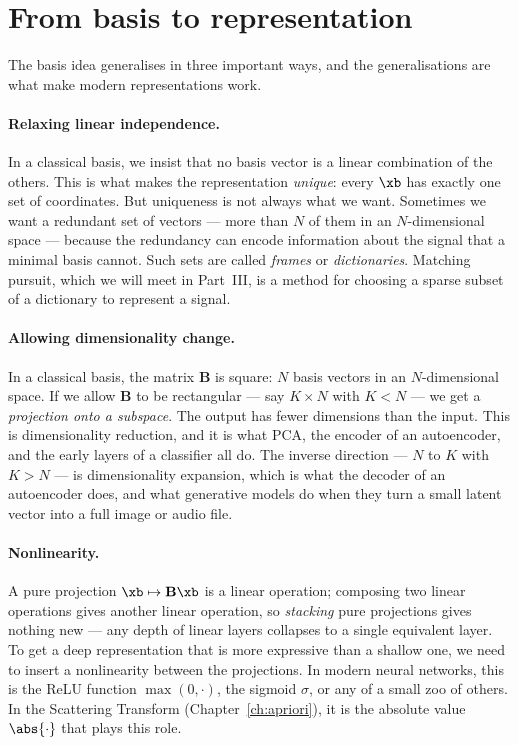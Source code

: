 \section{From basis to representation}
\label{sec:representations}

The basis idea generalises in three important ways, and the
generalisations are what make modern representations work.

\paragraph{Relaxing linear independence.}
In a classical basis, we insist that no basis vector is a linear
combination of the others.  This is what makes the representation
\emph{unique}: every $\xb$ has exactly one set of coordinates.  But
uniqueness is not always what we want.  Sometimes we want a redundant
set of vectors --- more than $N$ of them in an $N$-dimensional space ---
because the redundancy can encode information about the signal that a
minimal basis cannot.  Such sets are called \emph{frames} or
\emph{dictionaries}.  Matching pursuit, which we will meet in
Part~\textsc{III}, is a method for choosing a sparse subset of a
dictionary to represent a signal.

\paragraph{Allowing dimensionality change.}
In a classical basis, the matrix $\mathbf{B}$ is square: $N$ basis
vectors in an $N$-dimensional space.  If we allow $\mathbf{B}$ to be
rectangular --- say $K \times N$ with $K < N$ --- we get a
\emph{projection onto a subspace}.  The output has fewer dimensions than
the input.  This is dimensionality reduction, and it is what PCA, the
encoder of an autoencoder, and the early layers of a classifier all do.
The inverse direction --- $N$ to $K$ with $K > N$ --- is dimensionality
expansion, which is what the decoder of an autoencoder does, and what
generative models do when they turn a small latent vector into a full
image or audio file.

\paragraph{Nonlinearity.}
A pure projection $\xb \mapsto \mathbf{B}\xb$ is a linear operation;
composing two linear operations gives another linear operation, so
\emph{stacking} pure projections gives nothing new --- any depth of
linear layers collapses to a single equivalent layer.  To get a deep
representation that is more expressive than a shallow one, we need to
insert a nonlinearity between the projections.  In modern neural
networks, this is the ReLU function $\max(0, \cdot)$, the sigmoid
$\sigma$, or any of a small zoo of others.  In the Scattering Transform
(Chapter~\ref{ch:apriori}), it is the absolute value $\abs{\cdot}$ that
plays this role.

